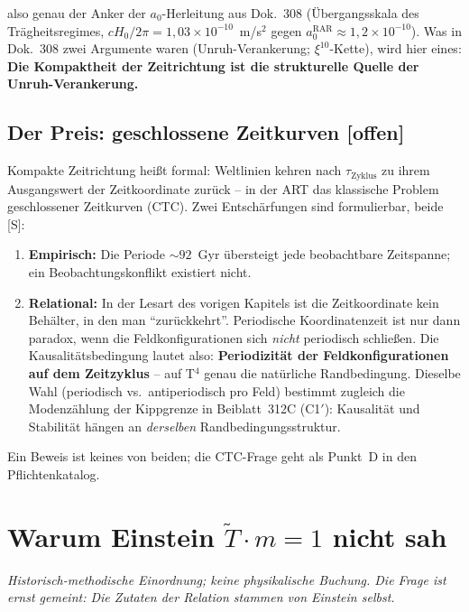 \documentclass[11pt]{report}
\begin{document}
also genau der Anker der $a_0$-Herleitung aus Dok.~308
(Übergangsskala des Trägheitsregimes, $cH_0/2\pi
= 1{,}03\times10^{-10}$~m/s$^2$ gegen
$a_0^\text{RAR} \approx 1{,}2\times10^{-10}$). Was in Dok.~308 zwei
Argumente waren (Unruh-Verankerung; $\xi^{10}$-Kette), wird hier
eines: \textbf{Die Kompaktheit der Zeitrichtung ist die strukturelle
Quelle der Unruh-Verankerung.}

\section{Der Preis: geschlossene Zeitkurven [offen]}

Kompakte Zeitrichtung heißt formal: Weltlinien kehren nach
$\tau_\text{Zyklus}$ zu ihrem Ausgangswert der Zeitkoordinate
zurück -- in der ART das klassische Problem geschlossener Zeitkurven
(CTC). Zwei Entschärfungen sind formulierbar, beide [S]:

\begin{enumerate}
  \item \textbf{Empirisch:} Die Periode $\sim 92$~Gyr übersteigt
        jede beobachtbare Zeitspanne; ein Beobachtungskonflikt
        existiert nicht.
  \item \textbf{Relational:} In der Lesart des vorigen Kapitels ist
        die Zeitkoordinate kein Behälter, in den man
        \enquote{zurückkehrt}. Periodische Koordinatenzeit ist nur
        dann paradox, wenn die Feldkonfigurationen sich \emph{nicht}
        periodisch schließen. Die Kausalitätsbedingung lautet also:
        \textbf{Periodizität der Feldkonfigurationen auf dem
        Zeitzyklus} -- auf T$^4$ genau die natürliche Randbedingung.
        Dieselbe Wahl (periodisch vs.\ antiperiodisch pro Feld)
        bestimmt zugleich die Modenzählung der Kippgrenze in
        Beiblatt~312C (C1$'$): Kausalität und Stabilität hängen an
        \emph{derselben} Randbedingungsstruktur.
\end{enumerate}

Ein Beweis ist keines von beiden; die CTC-Frage geht als Punkt~D in
den Pflichtenkatalog.

\chapter{Warum Einstein $\tilde T \cdot m = 1$ nicht sah}

\emph{Historisch-methodische Einordnung; keine physikalische
Buchung. Die Frage ist ernst gemeint: Die Zutaten der Relation
stammen von Einstein selbst.}
\end{document}
